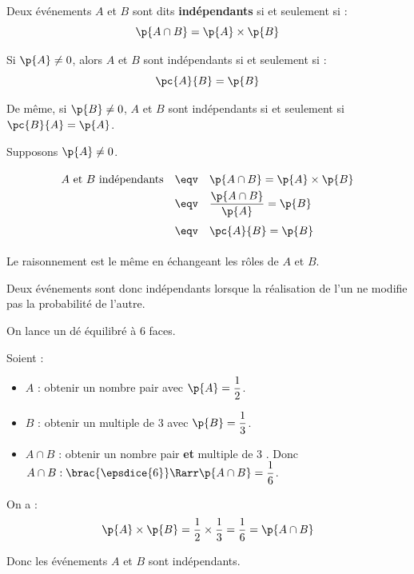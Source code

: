 \begin{defin}
	Deux événements $A$ et $B$ sont dits \textbf{indépendants} si et seulement si :
	\[
		\p{A \cap B} = \p{A} \times \p{B}
	\]
\end{defin}

\begin{prop}
	Si $\p{A} \neq 0$, alors $A$ et $B$ sont indépendants si et seulement si :
	\[
		\pc{A}{B} = \p{B}
	\]

	De même, si $\p{B} \neq 0$, $A$ et $B$ sont indépendants si et seulement si $\pc{B}{A} = \p{A}$.
\end{prop}

\newpage

\begin{demo}
	Supposons $\p{A} \neq 0$.
	\[
		\def\arraystretch{1.8}
		\begin{array}{rcl}
			A \text{ et } B \text{ indépendants} & \eqv & \p{A \cap B} = \p{A} \times \p{B}   \\
			                                     & \eqv & \dfrac{\p{A \cap B}}{\p{A}} = \p{B} \\
			                                     & \eqv & \pc{A}{B} = \p{B}
		\end{array}
	\]

	Le raisonnement est le même en échangeant les rôles de $A$ et $B$.
\end{demo}

\begin{rem}
	Deux événements sont donc indépendants lorsque la réalisation de l'un ne modifie pas la probabilité de l'autre.
\end{rem}

\begin{ex}
	On lance un dé équilibré à 6 faces.

	Soient :
	\begin{itemize}
		\item $A$ : \og obtenir un nombre pair \fg{} avec $\p{A}=\dfrac{1}{2}$.
		\item $B$ : \og obtenir un multiple de $3$ \fg{} avec $\p{B}=\dfrac{1}{3}$.
		\item $A\cap B$ : \og obtenir un nombre pair \textbf{et} multiple de $3$ \fg{}. Donc $A\cap B :\brac{\epsdice{6}}\Rarr\p{A \cap B} = \dfrac{1}{6}$.
	\end{itemize}

	On a :
	\[
		\p{A} \times \p{B} = \dfrac{1}{2} \times \dfrac{1}{3} = \dfrac{1}{6} = \p{A \cap B}
	\]

	Donc les événements $A$ et $B$ sont indépendants.
\end{ex}

